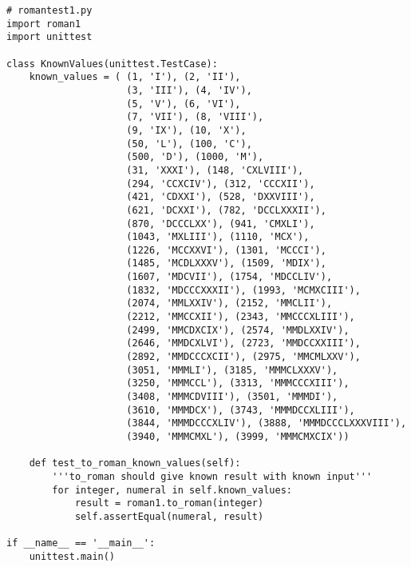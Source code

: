 \noindent\begin{minipage}{\textwidth}
\begin{lstlisting}[mathescape=True]
# romantest1.py
import roman1
import unittest

class KnownValues(unittest.TestCase):
    known_values = ( (1, 'I'), (2, 'II'),
                     (3, 'III'), (4, 'IV'),
                     (5, 'V'), (6, 'VI'),
                     (7, 'VII'), (8, 'VIII'),
                     (9, 'IX'), (10, 'X'),
                     (50, 'L'), (100, 'C'),
                     (500, 'D'), (1000, 'M'),
                     (31, 'XXXI'), (148, 'CXLVIII'),
                     (294, 'CCXCIV'), (312, 'CCCXII'),
                     (421, 'CDXXI'), (528, 'DXXVIII'),
                     (621, 'DCXXI'), (782, 'DCCLXXXII'),
                     (870, 'DCCCLXX'), (941, 'CMXLI'),
                     (1043, 'MXLIII'), (1110, 'MCX'),
                     (1226, 'MCCXXVI'), (1301, 'MCCCI'),
                     (1485, 'MCDLXXXV'), (1509, 'MDIX'),
                     (1607, 'MDCVII'), (1754, 'MDCCLIV'),
                     (1832, 'MDCCCXXXII'), (1993, 'MCMXCIII'),
                     (2074, 'MMLXXIV'), (2152, 'MMCLII'),
                     (2212, 'MMCCXII'), (2343, 'MMCCCXLIII'),
                     (2499, 'MMCDXCIX'), (2574, 'MMDLXXIV'),
                     (2646, 'MMDCXLVI'), (2723, 'MMDCCXXIII'),
                     (2892, 'MMDCCCXCII'), (2975, 'MMCMLXXV'),
                     (3051, 'MMMLI'), (3185, 'MMMCLXXXV'),
                     (3250, 'MMMCCL'), (3313, 'MMMCCCXIII'),
                     (3408, 'MMMCDVIII'), (3501, 'MMMDI'),
                     (3610, 'MMMDCX'), (3743, 'MMMDCCXLIII'),
                     (3844, 'MMMDCCCXLIV'), (3888, 'MMMDCCCLXXXVIII'),
                     (3940, 'MMMCMXL'), (3999, 'MMMCMXCIX'))

    def test_to_roman_known_values(self):
        '''to_roman should give known result with known input'''
        for integer, numeral in self.known_values:
            result = roman1.to_roman(integer)
            self.assertEqual(numeral, result)

if __name__ == '__main__':
    unittest.main()
\end{lstlisting}
\end{minipage}

